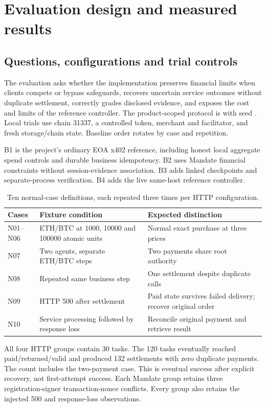\section{Evaluation design and measured results}\label{sec:evaluation}
\subsection{Questions, configurations and trial controls}
The evaluation asks whether the implementation preserves financial limits when clients compete or bypass safeguards, recovers uncertain service outcomes without duplicate settlement, correctly grades disclosed evidence, and exposes the cost and limits of the reference controller. The product-scoped protocol is  with seed . Local trials use chain 31337, a controlled token, merchant and facilitator, and fresh storage/chain state. Baseline order rotates by case and repetition.\citep{eval}

B1 is the project's ordinary EOA x402 reference, including honest local aggregate spend controls and durable business idempotency. B2 uses Mandate financial constraints without session-evidence association. B3 adds linked checkpoints and separate-process verification. B4 adds the live same-host reference controller.

\begin{table}[htbp]\centering\small
\begin{tabularx}{\linewidth}{L{1.4cm}L{3.8cm}Y}\toprule
Cases & Fixture condition & Expected distinction\\\midrule
N01--N06 & ETH/BTC at 1000, 10000 and 100000 atomic units & Normal exact purchase at three prices\\
N07 & Two agents, separate ETH/BTC steps & Two payments share root authority\\
N08 & Repeated same business step & One settlement despite duplicate calls\\
N09 & HTTP 500 after settlement & Paid state survives failed delivery; recover original order\\
N10 & Service processing followed by response loss & Reconcile original payment and retrieve result\\\bottomrule
\end{tabularx}\caption{Ten normal-case definitions, each repeated three times per HTTP configuration.}\label{tab:normalcases}\end{table}

All four HTTP groups contain 30 tasks. The 120 tasks eventually reached paid/returned/valid and produced 132 settlements with zero duplicate payments. The count includes the two-payment case. This is eventual success after explicit recovery, not first-attempt success. Each Mandate group retains three registration-signer transaction-nonce conflicts. Every group also retains the injected 500 and response-loss observations.

